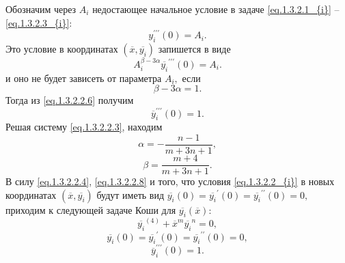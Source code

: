 {Обозначим через $ A_i $  недостающее начальное условие в задаче \eqref{eq.1.3.2.1_{i}} -- \eqref{eq.1.3.2.3_{i}}:
\begin{equation}\label{eq.1.3.2.2.5}
y_i^{\prime\prime\prime}(0)=A_i.
\end{equation}
Это условие в координатах $ (\overline {x},\overline{y_i}) $   запишется в виде
\begin{equation}\label{eq.1.3.2.2.6}
A_i^{\beta-3 \alpha}{\overline{y_i}}^{\prime\prime\prime}(0)=A_i.
\end{equation}
и  оно не будет зависеть от параметра $ A_i, $  если
\begin{equation}\label{eq.1.3.2.2.6}
\beta-3 \alpha=1.
\end{equation}
Тогда из \eqref{eq.1.3.2.2.6} получим
\begin{equation}\label{eq.1.3.2.2.8}
{\overline y}_i^{\prime\prime\prime}(0)=1.
\end{equation}
Решая систему \eqref{eq.1.3.2.2.3}, находим
\begin{equation}\label{eq.1.3.2.2.9}
\alpha=-\frac{n-1}{m+3n+1},
\end{equation}
\begin{equation}\label{eq.1.3.2.2.10}
 \beta=\frac{m+4}{m+3n+1}.
\end{equation}
В силу \eqref{eq.1.3.2.2.4}, \eqref{eq.1.3.2.2.8} и того, что условия \eqref{eq.1.3.2.2_{i}} в новых
координатах $ (\overline {x},\overline{y_i}) $ будут иметь вид
$ \overline{y_i}(0)={\overline{y_i}}^{\prime}(0)=
{\overline{y_i}}^{\prime\prime}(0)=0,$
приходим к следующей  задаче Коши для $ \overline{y_i}(\overline {x}): $
\begin{equation}\label{eq.1.3.2.2.11}
 {\overline{y_i}}^{(4)}+{\overline {x}}^m {\overline{y_i}}^n=0,
\end{equation}
\begin{equation}\label{eq.1.3.2.2.12}
\overline{y_i}(0)={\overline{y_i}}^{\prime}(0)=
{\overline{y_i}}^{\prime\prime}(0)=0,
\end{equation}
\begin{equation}\label{eq.1.3.2.2.13}
{\overline y}_i^{\prime\prime\prime}(0)=1.
\end{equation}


}
